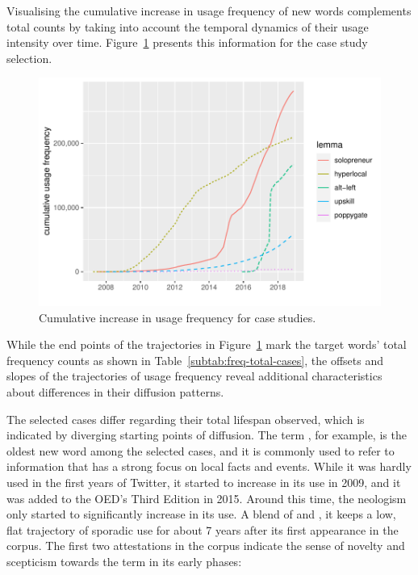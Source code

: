 \documentclass[
  a4paper,
  abstract=on,
  captions=tableabove
  ]{scrartcl}
\begin{document}
      Visualising the cumulative increase in usage frequency of new words complements total counts by taking into account the temporal dynamics of their usage intensity over time. Figure~\ref{fig:freq_cum_cases} presents this information for the case study selection.

      \begin{figure}
        \centering
        \includegraphics[width=\linewidth, height=.8\textheight, keepaspectratio]{img/freq_cum_cases.pdf}
        \caption{Cumulative increase in usage frequency for case studies.\protect\footnotemark}
        \label{fig:freq_cum_cases}
      \end{figure}

      While the end points of the trajectories in Figure~\ref{fig:freq_cum_cases} mark the target words' total frequency counts as shown in Table~\ref{subtab:freq-total-cases}, the offsets and slopes of the trajectories of usage frequency reveal additional characteristics about differences in their diffusion patterns.

      The selected cases differ regarding their total lifespan observed, which is indicated by diverging starting points of diffusion. The term , for example, is the oldest new word among the selected cases, and it is commonly used to refer to information that has a strong focus on local facts and events. While it was hardly used in the first years of Twitter, it started to increase in its use in 2009, and it was added to the OED's Third Edition in 2015. Around this time, the neologism  only started to significantly increase in its use. A blend of  and , it keeps a low, flat trajectory of sporadic use for about 7 years after its first appearance in the corpus. The first two attestations in the corpus indicate the sense of novelty and scepticism towards the term in its early phases:
\end{document}
